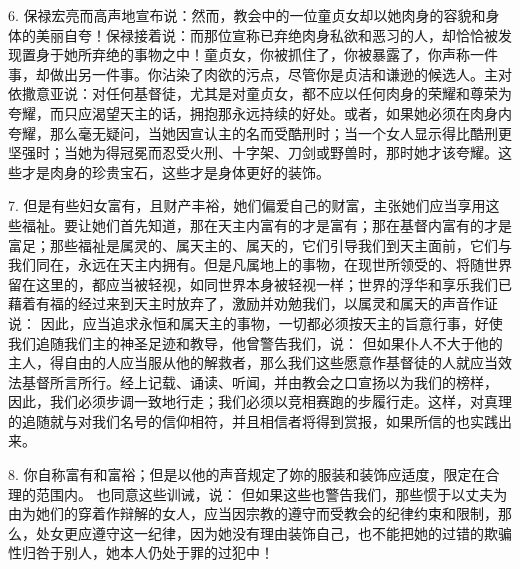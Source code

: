 6. 保禄宏亮而高声地宣布说：然而，教会中的一位童贞女却以她肉身的容貌和身体的美丽自夸！保禄接着说：而那位宣称已弃绝肉身私欲和恶习的人，却恰恰被发现置身于她所弃绝的事物之中！童贞女，你被抓住了，你被暴露了，你声称一件事，却做出另一件事。你沾染了肉欲的污点，尽管你是贞洁和谦逊的候选人。主对依撒意亚说：对任何基督徒，尤其是对童贞女，都不应以任何肉身的荣耀和尊荣为夸耀，而只应渴望天主的话，拥抱那永远持续的好处。或者，如果她必须在肉身内夸耀，那么毫无疑问，当她因宣认主的名而受酷刑时；当一个女人显示得比酷刑更坚强时；当她为得冠冕而忍受火刑、十字架、刀剑或野兽时，那时她才该夸耀。这些才是肉身的珍贵宝石，这些才是身体更好的装饰。\par

7. 但是有些妇女富有，且财产丰裕，她们偏爱自己的财富，主张她们应当享用这些福祉。要让她们首先知道，那在天主内富有的才是富有；那在基督内富有的才是富足；那些福祉是属灵的、属天主的、属天的，它们引导我们到天主面前，它们与我们同在，永远在天主内拥有。但是凡属地上的事物，在现世所领受的、将随世界留在这里的，都应当被轻视，如同世界本身被轻视一样；世界的浮华和享乐我们已藉着有福的经过来到天主时放弃了，激励并劝勉我们，以属灵和属天的声音作证说： 因此，应当追求永恒和属天主的事物，一切都必须按天主的旨意行事，好使我们追随我们主的神圣足迹和教导，他曾警告我们，说： 但如果仆人不大于他的主人，得自由的人应当服从他的解救者，那么我们这些愿意作基督徒的人就应当效法基督所言所行。经上记载、诵读、听闻，并由教会之口宣扬以为我们的榜样， 因此，我们必须步调一致地行走；我们必须以竞相赛跑的步履行走。这样，对真理的追随就与对我们名号的信仰相符，并且相信者将得到赏报，如果所信的也实践出来。\par

8. 你自称富有和富裕；但是以他的声音规定了妳的服装和装饰应适度，限定在合理的范围内。 也同意这些训诫，说： 但如果这些也警告我们，那些惯于以丈夫为由为她们的穿着作辩解的女人，应当因宗教的遵守而受教会的纪律约束和限制，那么，处女更应遵守这一纪律，因为她没有理由装饰自己，也不能把她的过错的欺骗性归咎于别人，她本人仍处于罪的过犯中！\par

